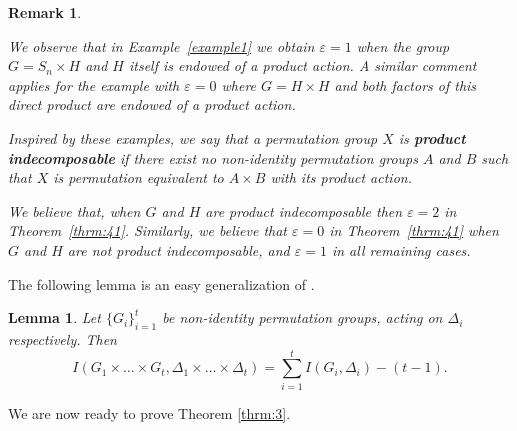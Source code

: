 \documentclass{amsart}
\newtheorem{lemma}[theorem]{Lemma}
\newtheorem{remark}[theorem]{Remark}
\begin{document}
\begin{remark}\label{monday}{\rm
We observe that in Example~\ref{example1} we obtain $\varepsilon=1$ when the group $G=S_n\times H$ and $H$ itself is endowed of a product action. A similar comment applies for the example with $\varepsilon=0$ where $G=H\times H$ and both factors of this direct product are endowed of a product action.

Inspired by these examples, we say that a permutation group $X$ is \textbf{\textit{product indecomposable}} if there exist no non-identity permutation groups $A$ and $B$  such that $X$ is permutation equivalent to $A\times B$ with its product action.

We believe that, when $G$ and $H$ are product indecomposable then $\varepsilon=2$ in Theorem~\ref{thrm:41}. Similarly, we believe that $\varepsilon=0$ in Theorem~\ref{thrm:41} when $G$ and $H$ are not product indecomposable, and $\varepsilon=1$ in all remaining cases.}
\end{remark}	
	The following lemma is an easy generalization of \cite[Lemma 2.6]{GLSp}.
	\begin{lemma}\label{aux}
		Let $\{G_i\}_{i=1}^t$ be non-identity permutation groups, acting on $\Delta_i$ respectively. Then
		\[
			I(G_1\times\dots\times G_t,\Delta_1\times\dots\times\Delta_t) = \sum_{i=1}^{t}I(G_i,\Delta_i) - (t-1).
		\]
	\end{lemma}
	We are now ready to prove Theorem \ref{thrm:3}.
\end{document}
